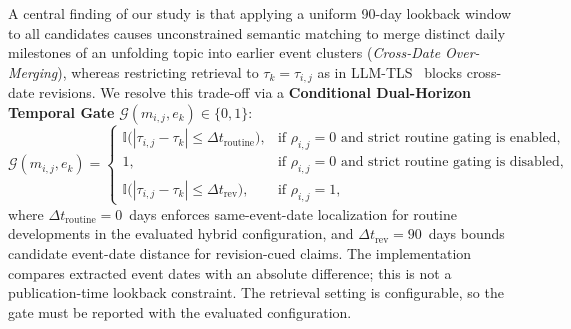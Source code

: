 \documentclass[journal]{IEEEtran}
\begin{document}
A central finding of our study is that applying a uniform 90-day lookback window to all candidates causes unconstrained semantic matching to merge distinct daily milestones of an unfolding topic into earlier event clusters (\textit{Cross-Date Over-Merging}), whereas restricting retrieval to $\tau_k = \tau_{i,j}$ as in LLM-TLS~\cite{hu2024moments} blocks cross-date revisions. We resolve this trade-off via a \textbf{Conditional Dual-Horizon Temporal Gate} $\mathcal{G}(m_{i,j}, e_k) \in \{0, 1\}$:
\begin{equation}
\mathcal{G}(m_{i,j}, e_k) = \begin{cases}
\mathbb{I}\big( |\tau_{i,j} - \tau_k| \le \Delta t_{\text{routine}} \big), & \text{if } \rho_{i,j} = 0 \text{ and strict routine gating is enabled}, \\[3pt]
1, & \text{if } \rho_{i,j} = 0 \text{ and strict routine gating is disabled}, \\[3pt]
\mathbb{I}\big( |\tau_{i,j} - \tau_k| \le \Delta t_{\text{rev}} \big), & \text{if } \rho_{i,j} = 1,
\end{cases}
\label{eq:temporal_gate}
\end{equation}
where $\Delta t_{\text{routine}} = 0$~days enforces same-event-date localization for routine developments in the evaluated hybrid configuration, and $\Delta t_{\text{rev}} = 90$~days bounds candidate event-date distance for revision-cued claims. The implementation compares extracted event dates with an absolute difference; this is not a publication-time lookback constraint. The retrieval setting is configurable, so the gate must be reported with the evaluated configuration.
\end{document}
